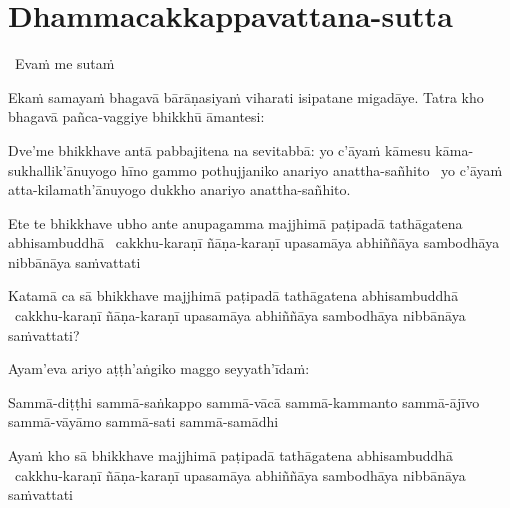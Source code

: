 
\section{Dhammacakkappavattana-sutta}
\label{dhammacakkappavattana-full}

\begin{leader}
  \anglebracketleft\ \hspace{-0.5mm}Evaṁ me sutaṁ \hspace{-0.5mm}\anglebracketright\
\end{leader}

\begin{pali-hang}
  Ekaṁ samayaṁ bhagavā bārāṇasiyaṁ viharati isipatane migadāye.  Tatra kho bhagavā pañca-vaggiye bhikkhū āmantesi:
\end{pali-hang}

\begin{pali-hang}
  Dve'me bhikkhave antā pabbajitena na sevitabbā: yo c'āyaṁ kāmesu kāma-sukhallik'ānuyogo hīno gammo pothujjaniko anariyo anattha-sañhito \breathmark\ yo c'āyaṁ atta-kilamath'ānuyogo dukkho anariyo anattha-sañhito.
\end{pali-hang}

\begin{pali-hang}
  Ete te bhikkhave ubho ante anupagamma majjhimā paṭipadā tathāgatena abhisambuddhā \breathmark\ cakkhu-karaṇī ñāṇa-karaṇī upasamāya abhiññāya sambodhāya nibbānāya saṁvattati
\end{pali-hang}

\begin{pali-hang}
  Katamā ca sā bhikkhave majjhimā paṭipadā tathāgatena abhisambuddhā \breathmark\ cakkhu-karaṇī ñāṇa-karaṇī upasamāya abhiññāya sambodhāya nibbānāya saṁvattati?
\end{pali-hang}

\begin{pali-hang}
  Ayam'eva ariyo aṭṭh'aṅgiko maggo seyyath'īdaṁ:
\end{pali-hang}

\begin{pali-hang}
  Sammā-diṭṭhi sammā-saṅkappo sammā-vācā sammā-kammanto sammā-ājīvo sammā-vāyāmo sammā-sati sammā-samādhi
\end{pali-hang}

\begin{pali-hang}
  Ayaṁ kho sā bhikkhave majjhimā paṭipadā tathāgatena abhisambuddhā \breathmark\ cakkhu-karaṇī ñāṇa-karaṇī upasamāya abhiññāya sambodhāya nibbānāya saṁvattati
\end{pali-hang}

